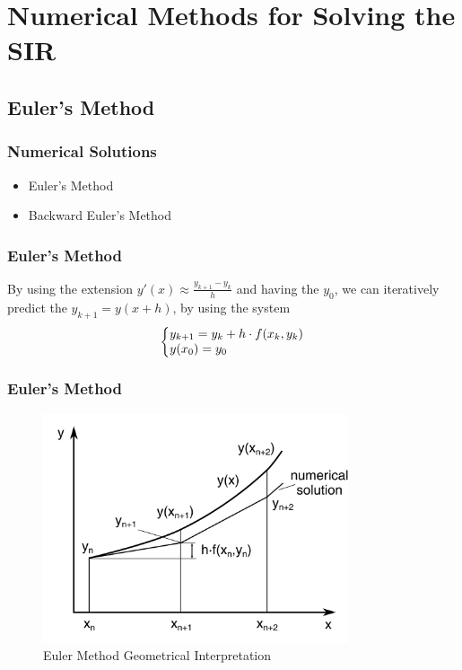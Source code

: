 \documentclass{beamer}
\makeatletter
\newenvironment{system}%
{\left\lbrace\begin{array}{@{}l@{}}}%
{\end{array}\right.}
\makeatother
\begin{document}
\section{Numerical Methods for Solving the SIR}
\subsection{Euler's Method}

\begin{frame}\frametitle{Numerical Solutions}
\begin{itemize}
\item Euler's Method
\item Backward Euler's Method
\end{itemize}
\end{frame}

\begin{frame}\frametitle{Euler's Method}
    By using the extension $y'(x) \approx \frac{y_{k+1}-y_{k}}{h}$ and having the
$y_0$, we can iteratively predict the $y_{k+1}=y(x+h)$, by using the system
\vspace{1.5cm}
\large
\begin{equation*}
    \begin{system}
	    y_{k+1} = y_k + h\cdot f(x_k,y_k)
        \\
        y(x_0)=y_0
    \end{system}
\end{equation*}

\end{frame}

\begin{frame}\frametitle{Euler's Method}
    \begin{figure}
        \caption{Euler Method Geometrical Interpretation}
        \centering
        \includegraphics[width=9cm]{Figure_Euler_geom.png}
    \end{figure}
\end{frame}
\end{document}
